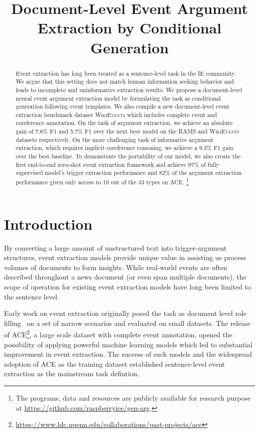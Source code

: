 \title{Document-Level Event Argument Extraction by Conditional Generation}



\maketitle

\begin{abstract}
Event extraction has long been treated as a sentence-level task in the IE community. We argue that this setting does not match human information seeking behavior and leads to incomplete and uninformative extraction results.
We propose a document-level neural event argument extraction model by formulating the task as conditional generation following event templates. We also compile a new document-level event extraction benchmark dataset \textsc{WikiEvents} which includes complete event and coreference annotation. On the task of argument extraction, we achieve an absolute gain of 7.6\% F1 and 5.7\% F1 over the next best model on the \textsc{RAMS} and \textsc{WikiEvents} datasets respectively. On the more challenging task of informative argument extraction, which requires implicit coreference reasoning, we achieve a 9.3\% F1 gain over the best baseline.  
To demonstrate the portability of our model, we also create the first end-to-end zero-shot event extraction framework and achieve 97\% of 
fully supervised model's trigger extraction performance and 82\% of the argument extraction  performance given only access to 10 out of the 33 types on \textsc{ACE}.
\footnote{The programs, data and resources are publicly available for research purpose at \url{https://github.com/raspberryice/gen-arg}.}

\end{abstract}

\section{Introduction}

By converting a large amount of unstructured text into trigger-argument structures, event extraction models provide unique value in assisting us process volumes of documents to form insights. While real-world events are often described throughout a news document (or even span multiple documents), the scope of operation for existing event extraction models have long been limited to the sentence level.

Early work on event extraction originally posed the task as document level role filling~\cite{Grishman1996MUC6} 
on a set of narrow scenarios %
and evaluated on small datasets. 
The release of ACE\footnote{\url{https://www.ldc.upenn.edu/collaborations/past-projects/ace}}, a large scale dataset with complete event annotation, opened the possibility of applying powerful machine learning models 
which led to substantial improvement in event extraction. The success of such models and the widespread adoption of ACE as the training dataset established sentence-level event extraction as the mainstream task defintion. 

